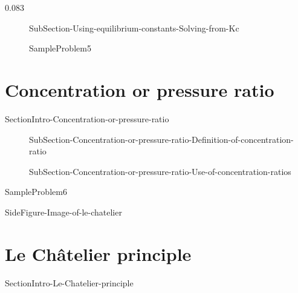 0.083\documentclass[main.tex]{subfiles}
\begin{document}
   
   \sloppy
\begin{description}
\item[]{SubSection-Using-equilibrium-constants-Solving-from-Kc}



  {SampleProblem5}
\end{description}
 



\section{ Concentration or pressure ratio}
   {SectionIntro-Concentration-or-pressure-ratio}
\sloppy\begin{description}

\item[] {SubSection-Concentration-or-pressure-ratio-Definition-of-concentration-ratio}



\item[] {SubSection-Concentration-or-pressure-ratio-Use-of-concentration-ratios}


\end{description}
  {SampleProblem6}










{SideFigure-Image-of-le-chatelier}

\section{ {Le Ch\^{a}telier principle}}
   {SectionIntro-Le-Chatelier-principle}
\end{document}
